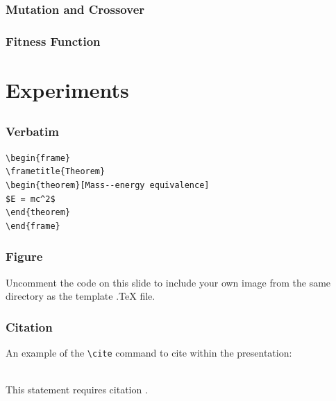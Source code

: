 \documentclass{beamer}
\begin{document}

\begin{frame}
\frametitle{Mutation and Crossover}

\end{frame}


\begin{frame}
\frametitle{Fitness Function}

\end{frame}

\section{Experiments}
\subsection{}

\begin{frame}[fragile] %
\frametitle{Verbatim}
\begin{example}
\begin{verbatim}
\begin{frame}
\frametitle{Theorem}
\begin{theorem}[Mass--energy equivalence]
$E = mc^2$
\end{theorem}
\end{frame}\end{verbatim}
\end{example}
\end{frame}


\begin{frame}
\frametitle{Figure}
Uncomment the code on this slide to include your own image from the same directory as the template .TeX file.
\end{frame}


\begin{frame}[fragile] %
\frametitle{Citation}
An example of the \verb|\cite| command to cite within the presentation:\\~

This statement requires citation \cite{p1}.
\end{frame}
\end{document}
